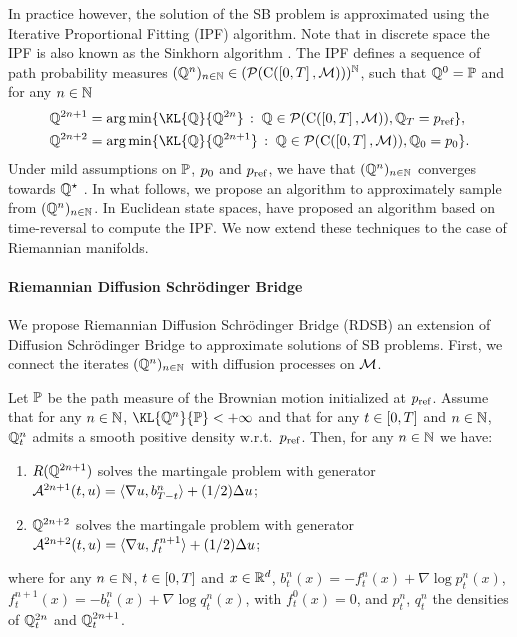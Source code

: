 In practice however, the solution of the SB problem is approximated using the
Iterative Proportional Fitting (IPF) algorithm. Note that in discrete space the
IPF is also known as the Sinkhorn algorithm \citep{sinkhorn1967diagonal,peyre2019computational}. The
IPF defines a sequence of path probability measures
$(\mathbb{Q}^n)_{n \in \mathbb{N}} \in (\mathcal{P}(\mathrm{C}(\left[0,T\right], \mathcal M)))^{\mathbb{N}}$, such that
$\mathbb{Q}^0 = \mathbb{P}$ and for any $n \in \mathbb{N}$
\begin{align}
  &\Qbb^{2n+1} = \argmin \ensembleLigne{\KL{\Qbb}{\Qbb^{2n}}}{\Qbb \in \Pens(\rmc(\ccint{0,T}, \M)), \Qbb_T = \piinv}  , \\
  &\Qbb^{2n+2} = \argmin \ensembleLigne{\KL{\Qbb}{\Qbb^{2n+1}}}{\Qbb \in \Pens(\rmc(\ccint{0,T}, \M)), \Qbb_0 = \pizero} .
\end{align}
Under mild assumptions on $\mathbb{P}$, $p_0$ and $p_{\textup{ref}}$, we have that
$(\mathbb{Q}^n)_{n \in \mathbb{N}}$ converges towards $\mathbb{Q}^\star$ \cite[see][]{nutz2022stability}.
In what follows, we propose an algorithm to
approximately sample from $(\mathbb{Q}^n)_{n \in \mathbb{N}}$. In Euclidean state spaces,
\cite{debortoli2021neurips,vargas2021solving,chen2021likelihood} have proposed
an algorithm based on time-reversal to compute the IPF. We now extend these
techniques to the case of Riemannian manifolds.

\paragraph{Riemannian Diffusion Schr\"odinger Bridge}

We propose Riemannian Diffusion Schr\"odinger Bridge (RDSB) an extension of
Diffusion Schr\"odinger Bridge \cite{debortoli2021neurips} to approximate
solutions of SB problems. First, we connect the iterates
$(\mathbb{Q}^n)_{n \in \mathbb{N}}$ with diffusion processes on $\mathcal M$.

\begin{proposition}
  \label{prop:continuous_schro}
  Let $\mathbb{P}$ be the path measure of the Brownian motion initialized at $p_{\textup{ref}}$.
  Assume that for any $n \in \mathbb{N}$, $\KL{\Qbb^n}{\Pbb}< +\infty$ and that for
  any $t \in \left[0,T\right]$ and $n \in \mathbb{N}$, $\mathbb{Q}^n_t$ admits a smooth positive
  density w.r.t.\ $p_{\textup{ref}}$. Then, for any $n \in \mathbb{N}$ we have:
  \begin{enumerate}[wide, labelwidth=!, labelindent=0pt, label=(\alph*)]
  \item $R(\mathbb{Q}^{2n+1})$ solves the martingale problem with generator $\mathcal{A}^{2n+1}(t,u) = \langle \nabla u, b_{T-t}^n \rangle + (1/2) \Delta u$;
  \item $\mathbb{Q}^{2n+2}$ solves the martingale problem with generator $\mathcal{A}^{2n+2}(t,u) = \langle \nabla u, f_{t}^{n+1} \rangle + (1/2) \Delta u$;    
  \end{enumerate}
  where for any $n \in \mathbb{N}$, $t \in \left[0,T\right]$ and 
  $x \in \mathbb{R}^d$, $b^{n}_t( x) = -f^{n}_t(x) + \nabla \log p^{n}_t(x)$, 
  $f^{n+1}_t(x) = -b^n_t(x) + \nabla \log q^n_t(x)$, with $f^0_t(x) = 0$, and $p^n_t$, $q_t^n$
  the densities of $\mathbb{Q}^{2n}_t$ and  $\mathbb{Q}_t^{2n+1}$.
\end{proposition}

